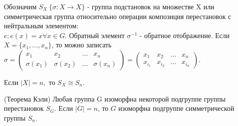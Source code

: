 Обозначим \(S_X \ \{\sigma:X\to X\}\) - группа подстановок на множестве X или симметрическая группа относительно операции композиция перестановок с нейтральным элементом: \\ \(e: e(x) =x \forall x\in G\). Обратный элемент \(\sigma^{-1}\) - обратное отображение. Если \(X = \{x_1, \ldots, x_n\}\), то можно записать \(\sigma = \begin{pmatrix}
x_1 & x_2 & \ldots & x_n \\
\sigma(x_1) & \sigma(x_2) & \ldots & \sigma(x_n)
\end{pmatrix} = \begin{pmatrix}
x_1 & x_2 & \ldots & x_n \\
x_{i_1} & x_{i_2} & \ldots & x_{i_n}
\end{pmatrix}\). 

Если \(|X| = n, \) то \(S_X\cong S_n\).
\begin{theorem}
	(Теорема Кэли) \newline
	Любая группа G изоморфна некоторой подгруппе группы перестановок \(S_{G}\). Если \(|G| =n\), то \(G\) изоморфна подгруппе симметрической группы \(S_n\).
\end{theorem}
